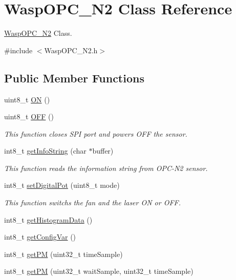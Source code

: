 \hypertarget{class_wasp_o_p_c___n2}{}\section{Wasp\+O\+P\+C\+\_\+\+N2 Class Reference}
\label{class_wasp_o_p_c___n2}


\hyperlink{class_wasp_o_p_c___n2}{Wasp\+O\+P\+C\+\_\+\+N2} Class.  




{\ttfamily \#include $<$Wasp\+O\+P\+C\+\_\+\+N2.\+h$>$}

\subsection*{Public Member Functions}
\begin{DoxyCompactItemize}
\item 
uint8\+\_\+t \hyperlink{class_wasp_o_p_c___n2_a76c53abed9f7a08ff7ea42449830a999}{ON} ()
\item 
uint8\+\_\+t \hyperlink{class_wasp_o_p_c___n2_a00799d70ae05c6fb966f26b3401d284f}{O\+FF} ()
\begin{DoxyCompactList}\small\item\em This function closes S\+PI port and powers O\+FF the sensor. \end{DoxyCompactList}\item 
int8\+\_\+t \hyperlink{class_wasp_o_p_c___n2_aafc2647dffbf844a3161ec4e8a73d8ac}{get\+Info\+String} (char $\ast$buffer)
\begin{DoxyCompactList}\small\item\em This function reads the information string from O\+P\+C-\/\+N2 sensor. \end{DoxyCompactList}\item 
int8\+\_\+t \hyperlink{class_wasp_o_p_c___n2_ac0961abaf70c0e71d6d73fe9b66ce51c}{set\+Digital\+Pot} (uint8\+\_\+t mode)
\begin{DoxyCompactList}\small\item\em This function switchs the fan and the laser ON or O\+FF. \end{DoxyCompactList}\item 
int8\+\_\+t \hyperlink{class_wasp_o_p_c___n2_afadcbff0f8354d5131b132e19155f38d}{get\+Histogram\+Data} ()
\item 
int8\+\_\+t \hyperlink{class_wasp_o_p_c___n2_a4e0abf766cf5ecbb0e0e60bf9e5aaeec}{get\+Config\+Var} ()
\item 
int8\+\_\+t \hyperlink{class_wasp_o_p_c___n2_a8d680ea80de6f31db7267ffc89fff55b}{get\+PM} (uint32\+\_\+t time\+Sample)
\item 
int8\+\_\+t \hyperlink{class_wasp_o_p_c___n2_ab91d52954c61f786c1bc1aa688a28a67}{get\+PM} (uint32\+\_\+t wait\+Sample, uint32\+\_\+t time\+Sample)
\end{DoxyCompactItemize}
